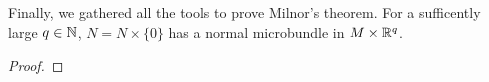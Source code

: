Finally, we gathered all the tools to prove Milnor's theorem.
For a sufficently large $q \in \mathbb{N}$, $N = N \times \{0\}$ has a normal microbundle in $M \times \mathbb{R}^q$.
\begin{proof}
\end{proof}
